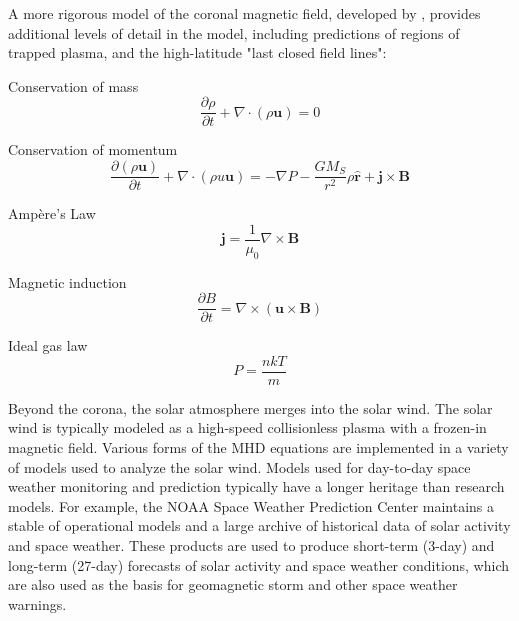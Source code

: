 \documentclass{article}
\begin{document}
A more rigorous model of the coronal magnetic field, developed by \cite{Endeve2003}, provides additional levels of detail in the model, including predictions of regions of trapped plasma, and the high-latitude "last closed field lines":

\bigskip

Conservation of mass
\begin{equation}
    \frac {\partial \rho} {\partial t} + \nabla \cdotp \left(\rho \mathbf u \right) = 0
    \label{eq:ELH1}
\end{equation}

Conservation of momentum
\begin{equation}
    \frac {\partial \left( \rho \mathbf u \right)} {\partial t} + \nabla \cdotp \left(\rho u \mathbf u \right) = - \nabla P - \frac {G M_S} {r^2} \rho \mathbf {\hat r} + \mathbf j \times \mathbf B
    \label{eq:ELH2}
\end{equation}

Amp\`ere's Law
\begin{equation}
    \mathbf j = \frac {1} {\mu_0} \nabla \times \mathbf B
    \label{eq:ELH3}
\end{equation}

Magnetic induction
\begin{equation}
    \frac {\partial B} {\partial t} = \nabla \times \left( \mathbf u \times \mathbf B \right)
    \label{eq:ELH4}
\end{equation}

Ideal gas law
\begin{equation}
    P = \frac {n k T} {m}
    \label{eq:ELH5}
\end{equation}

Beyond the corona, the solar atmosphere merges into the solar wind. The solar wind is typically modeled as a high-speed collisionless plasma with a frozen-in magnetic field. Various forms of the MHD equations are implemented in a variety of models used to analyze the solar wind. Models used for day-to-day space weather monitoring and prediction typically have a longer heritage than research models. For example, the NOAA Space Weather Prediction Center \cite{swpc} maintains a stable of operational models and a large archive of historical data of solar activity and space weather. These products are used to produce short-term (3-day) and long-term (27-day) forecasts of solar activity and space weather conditions, which are also used as the basis for geomagnetic storm and other space weather warnings.
\end{document}
